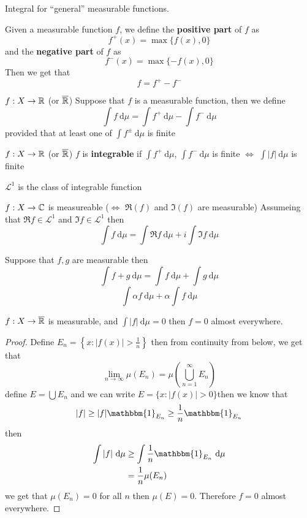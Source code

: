 Integral for ``general'' measurable functions.

\begin{definition}
  Given a measurable function $f$, we define the \textbf{positive part} of $f$ as 
  \[f^+(x) = \max\{f(x), 0\}\]
  and the \textbf{negative part} of $f$ as
  \[f^-(x) = \max\{-f(x), 0\}\]
  Then we get that 
  \[f = f^+ - f^-\]
\end{definition}

\begin{definition}
  $f: X \to \mathbb R$ (or $\overline{\mathbb R}$)
  Suppose that $f$ is a measurable function, then we define
  \[\int f \ \mathrm{d}\mu = \int f^+\ \mathrm{d}\mu - \int f^-\ \mathrm{d}\mu\]
  provided that at least one of $\int f^\pm \ \mathrm{d}\mu$ is finite
\end{definition}
\begin{definition}
  $f: X \to \mathbb R$ (or $\overline{\mathbb R}$)
  $f$ is \textbf{integrable} if $\int f^+ \ \mathrm{d}\mu$, $\int f^- \ \mathrm{d}\mu$ is finite
  $\iff$ $\int |f| \ \mathrm{d}\mu$ is finite

  $\mathcal{L}^1$ is the class of integrable function
\end{definition}

\begin{definition}
$f: X \to \mathbb C$ is measureable ($\iff$ $\Re(f)$ and $\Im(f)$ are measurable)
Assumeing that $\Re f \in \mathcal{L}^1$ and $\Im f \in \mathcal{L}^1$ then
\[\int f\ \mathrm{d}\mu = \int \Re f \ \mathrm{d}\mu + i \int \Im f \ \mathrm{d}\mu\]
\end{definition}

\begin{claim}
  Suppose that $f, g$ are measurable then
  \[\int f + g\ \mathrm{d}\mu  = \int f\ \mathrm{d}\mu + \int g\ \mathrm{d}\mu\]
  \[\int \alpha f \ \mathrm{d}\mu + \alpha \int f \ \mathrm{d}\mu\]
\end{claim}

\begin{lemma}
  $f: X \to \overline{\mathbb R}$ is measurable, and $\int |f| \ \mathrm{d}\mu = 0$ then $f = 0$ almost everywhere.
\end{lemma}

\begin{proof}
  Define $E_n = \left\{x : |f(x)| > \frac1n\right\}$ then from continuity from below, we get that
  \[\lim_{n\to\infty}\mu(E_n) = \mu\left(\bigcup_{n=1}^\infty E_n\right)\]
  define $E = \bigcup E_n$ and we can write $E = \{x : |f(x)| > 0 \}$then we know that
  \[|f| \ge |f|\mathbbm{1}_{E_n} \ge \frac1n\mathbbm{1}_{E_n}\]
  then 
  \begin{align*}
    \int |f|\ \mathrm{d}\mu &\ge \int \frac1n\mathbbm{1}_{E_n}\ \mathrm{d}\mu \\
    &= \frac1n \mu(E_n) \\
  \end{align*}
  we get that $\mu(E_n) = 0$ for all $n$ then $\mu(E) = 0$. Therefore $f = 0$ almost everywhere.
\end{proof}

